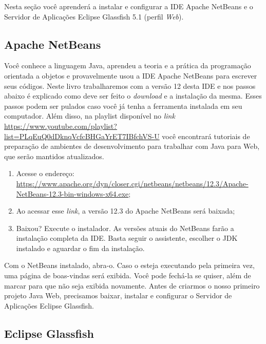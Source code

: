 Nesta seção você aprenderá a instalar e configurar a IDE Apache NetBeans e o Servidor de Aplicações Eclipse Glassfish 5.1 (perfil \textit{Web}).


\subsection{Apache NetBeans}

Você conhece a linguagem Java, aprendeu a teoria e a prática da programação orientada a objetos e provavelmente usou a IDE Apache NetBeans para escrever seus códigos. Neste livro trabalharemos com a versão 12 desta IDE e nos passos abaixo é explicado como deve ser feito o \textit{download} e a instalação da mesma. Esses passos podem ser pulados caso você já tenha a ferramenta instalada em seu computador. Além disso, na playlist disponível no \textit{link} \url{https://www.youtube.com/playlist?list=PLqEuQ0dDknqVcfcBHGaYrET7IBfchVS-U} você encontrará tutoriais de preparação de ambientes de desenvolvimento para trabalhar com Java para Web, que serão mantidos atualizados.

\begin{enumerate}

    \item Acesse o endereço: \url{https://www.apache.org/dyn/closer.cgi/netbeans/netbeans/12.3/Apache-NetBeans-12.3-bin-windows-x64.exe};
    
    \item Ao acessar esse \textit{link}, a versão 12.3 do Apache NetBeans será baixada;
    
    \item Baixou? Execute o instalador. As versões atuais do NetBeans farão a instalação completa da IDE. Basta seguir o assistente, escolher o JDK instalado e aguardar o fim da instalação.
    
\end{enumerate}

Com o NetBeans instalado, abra-o. Caso o esteja executando pela primeira vez, uma página de boas-vindas será exibida. Você pode fechá-la se quiser, além de marcar para que não seja exibida novamente. Antes de criarmos o nosso primeiro projeto Java Web, precisamos baixar, instalar e configurar o Servidor de Aplicações Eclipse Glassfish.


\subsection{Eclipse Glassfish}


